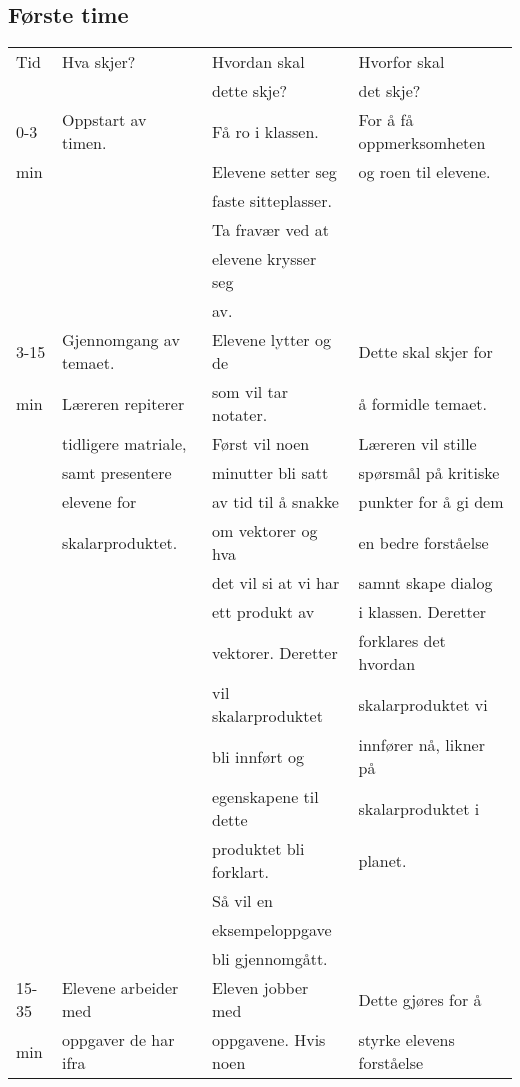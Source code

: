 \documentclass{article}
\begin{document}
\subsection*{Første time}
\label{sec-2-1}
\begin{center}
\begin{tabular}{l|l|l|l}
Tid & Hva skjer? & Hvordan skal & Hvorfor skal\\
 &  & dette skje? & det skje?\\
\hline
0-3 & Oppstart av timen. & Få ro i klassen. & For å få oppmerksomheten\\
min &  & Elevene setter seg & og roen til elevene.\\
 &  & faste sitteplasser. & \\
 &  & Ta fravær ved at & \\
 &  & elevene krysser seg & \\
 &  & av. & \\
\hline
3-15 & Gjennomgang av temaet. & Elevene lytter og de & Dette skal skjer for\\
min & Læreren repiterer & som vil tar notater. & å formidle temaet.\\
 & tidligere matriale, & Først vil noen & Læreren vil stille\\
 & samt presentere & minutter bli satt & spørsmål på kritiske\\
 & elevene for & av tid til å snakke & punkter for å gi dem\\
 & skalarproduktet. & om vektorer og hva & en bedre forståelse\\
 &  & det vil si at vi har & samnt skape dialog\\
 &  & ett produkt av & i klassen. Deretter\\
 &  & vektorer. Deretter & forklares det hvordan\\
 &  & vil skalarproduktet & skalarproduktet vi\\
 &  & bli innført og & innfører nå, likner på\\
 &  & egenskapene til dette & skalarproduktet i\\
 &  & produktet bli forklart. & planet.\\
 &  & Så vil en & \\
 &  & eksempeloppgave & \\
 &  & bli gjennomgått. & \\
\hline
15-35 & Elevene arbeider med & Eleven jobber med & Dette gjøres for å\\
min & oppgaver de har ifra & oppgavene. Hvis noen & styrke elevens forståelse\\

\end{tabular}
\end{center}
\end{document}
